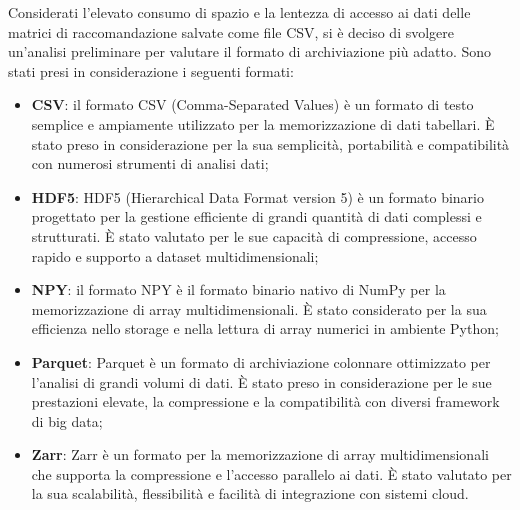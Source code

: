 Considerati l'elevato consumo di spazio e la lentezza di accesso ai dati delle matrici di raccomandazione salvate come file CSV, si è deciso di svolgere un'analisi preliminare per valutare il formato di archiviazione più adatto. Sono stati presi in considerazione i seguenti formati:
\begin{itemize}
    \item \textbf{CSV}: il formato CSV (Comma-Separated Values) è un formato di testo semplice e ampiamente utilizzato per la memorizzazione di dati tabellari. È stato preso in considerazione per la sua semplicità, portabilità e compatibilità con numerosi strumenti di analisi dati;
    \item \textbf{HDF5}: HDF5 (Hierarchical Data Format version 5) è un formato binario progettato per la gestione efficiente di grandi quantità di dati complessi e strutturati. È stato valutato per le sue capacità di compressione, accesso rapido e supporto a dataset multidimensionali;
    \item \textbf{NPY}: il formato NPY è il formato binario nativo di NumPy per la memorizzazione di array multidimensionali. È stato considerato per la sua efficienza nello storage e nella lettura di array numerici in ambiente Python;
    \item \textbf{Parquet}: Parquet è un formato di archiviazione colonnare ottimizzato per l'analisi di grandi volumi di dati. È stato preso in considerazione per le sue prestazioni elevate, la compressione e la compatibilità con diversi framework di big data;
    \item \textbf{Zarr}: Zarr è un formato per la memorizzazione di array multidimensionali che supporta la compressione e l'accesso parallelo ai dati. È stato valutato per la sua scalabilità, flessibilità e facilità di integrazione con sistemi cloud.
\end{itemize}

